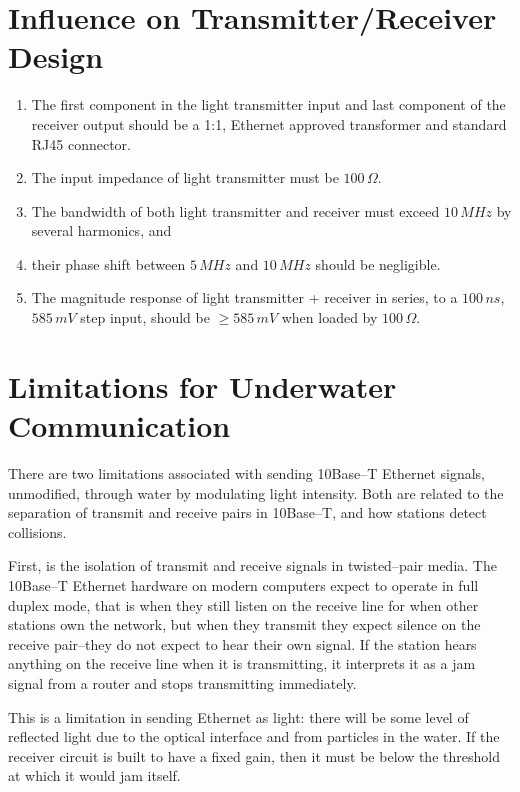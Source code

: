﻿\documentclass{article}
\begin{document}
\section{Influence on Transmitter/Receiver Design}

\begin{enumerate}
\item The first component in the light transmitter input
and last component of the receiver output should be a 1:1, Ethernet approved
transformer and standard RJ45 connector.
\item The input impedance of light transmitter must be $100\,\Omega$.
\item The bandwidth of both light transmitter and receiver must exceed $10\,MHz$
by several harmonics, and
\item their phase shift between $5\,MHz$ and $10\,MHz$ should be negligible.
\item The magnitude response of light transmitter + receiver in series,
to a $100\,ns$, $585\,mV$ step input, should be $\geq585\,mV$ when loaded by $100\,\Omega$.
\end{enumerate}

\section{Limitations for Underwater Communication}

There are two limitations associated with sending 10Base--T Ethernet signals,
unmodified, through water by modulating light intensity.
Both are related to the separation of transmit and receive pairs
in 10Base--T, and how stations detect collisions.

First, is the isolation of transmit and receive signals in twisted--pair media.
The 10Base--T Ethernet hardware on modern computers expect to operate in full
duplex mode, that is when they still listen on the receive line for when
other stations own the network, but when they transmit they expect silence
on the receive pair--they do not expect to hear their own signal.
If the station hears anything on the receive line when it is transmitting,
it interprets it as a jam signal from a router and stops transmitting immediately.

This is a limitation in sending Ethernet as light: there will be some
level of reflected light due to the optical interface and from particles in the water.
If the receiver circuit is built to have a fixed gain, then it must be below
the threshold at which it would jam itself.
\end{document}
